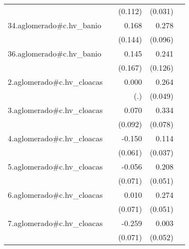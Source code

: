 {\begin{longtable}{l*{4}{D{.}{.}{-1}}}
            &                     &     (0.112)         &     (0.031)         &                     \\
\addlinespace
34.aglomerado#c.hv\_banio&                     &       0.168         &       0.278\sym{**} &                     \\
            &                     &     (0.144)         &     (0.096)         &                     \\
\addlinespace
36.aglomerado#c.hv\_banio&                     &       0.145         &       0.241         &                     \\
            &                     &     (0.167)         &     (0.126)         &                     \\
\addlinespace
2.aglomerado#c.hv\_cloacas&                     &       0.000         &       0.264\sym{***}&                     \\
            &                     &         (.)         &     (0.049)         &                     \\
\addlinespace
3.aglomerado#c.hv\_cloacas&                     &       0.070         &       0.334\sym{***}&                     \\
            &                     &     (0.092)         &     (0.078)         &                     \\
\addlinespace
4.aglomerado#c.hv\_cloacas&                     &      -0.150\sym{*}  &       0.114\sym{**} &                     \\
            &                     &     (0.061)         &     (0.037)         &                     \\
\addlinespace
5.aglomerado#c.hv\_cloacas&                     &      -0.056         &       0.208\sym{***}&                     \\
            &                     &     (0.071)         &     (0.051)         &                     \\
\addlinespace
6.aglomerado#c.hv\_cloacas&                     &       0.010         &       0.274\sym{***}&                     \\
            &                     &     (0.071)         &     (0.051)         &                     \\
\addlinespace
7.aglomerado#c.hv\_cloacas&                     &      -0.259\sym{***}&       0.003         &                     \\
            &                     &     (0.071)         &     (0.052)         &                     \\

\end{longtable}}
